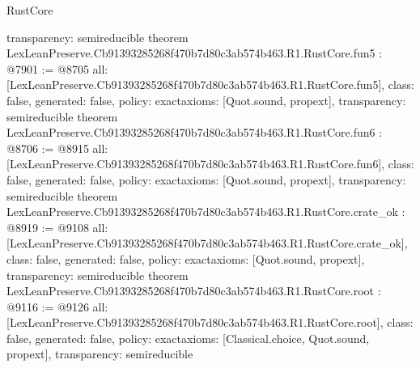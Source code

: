 \begin{lexlean}{RustCore}
\begin{coremodule}
{  transparency: semireducible
}
theorem LexLeanPreserve.Cb91393285268f470b7d80c3ab574b463.R1.RustCore.fun5 : @7901 := @8705 {
  all: [LexLeanPreserve.Cb91393285268f470b7d80c3ab574b463.R1.RustCore.fun5],
  class: false,
  generated: false,
  policy: exact{axioms: [Quot.sound, propext]},
  transparency: semireducible
}
theorem LexLeanPreserve.Cb91393285268f470b7d80c3ab574b463.R1.RustCore.fun6 : @8706 := @8915 {
  all: [LexLeanPreserve.Cb91393285268f470b7d80c3ab574b463.R1.RustCore.fun6],
  class: false,
  generated: false,
  policy: exact{axioms: [Quot.sound, propext]},
  transparency: semireducible
}
theorem LexLeanPreserve.Cb91393285268f470b7d80c3ab574b463.R1.RustCore.crate_ok : @8919 := @9108 {
  all: [LexLeanPreserve.Cb91393285268f470b7d80c3ab574b463.R1.RustCore.crate_ok],
  class: false,
  generated: false,
  policy: exact{axioms: [Quot.sound, propext]},
  transparency: semireducible
}
theorem LexLeanPreserve.Cb91393285268f470b7d80c3ab574b463.R1.RustCore.root : @9116 := @9126 {
  all: [LexLeanPreserve.Cb91393285268f470b7d80c3ab574b463.R1.RustCore.root],
  class: false,
  generated: false,
  policy: exact{axioms: [Classical.choice, Quot.sound, propext]},
  transparency: semireducible
}


\end{coremodule}
\end{lexlean}
